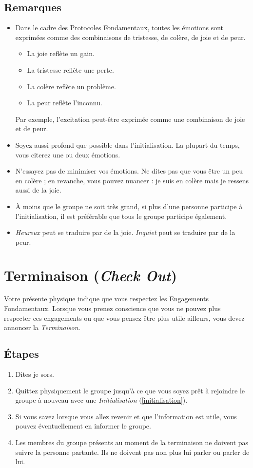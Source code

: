 \documentclass[11pt]{book}
\newcommand*{\numref}[1]{{\hyperref[{#1}]{\autoref*{#1}}}}
\let\oldsection\section
\renewcommand\section{\clearpage\oldsection}
\begin{document}
\subsection{Remarques}
\begin{itemize}
	\item Dans le cadre des Protocoles Fondamentaux, toutes les émotions sont exprimées comme des combinaisons de tristesse, de colère,
	      de joie et de peur.
	      \begin{itemize}
	      	\item La joie reflète un gain.
	      	\item La tristesse reflète une perte.
	      	\item La colère reflète un problème.
	      	\item La peur reflète l'inconnu.
	      \end{itemize}
	      Par exemple, l'excitation peut-être exprimée comme une combinaison de joie et de peur.
	\item Soyez aussi profond que possible dans l'initialisation. La plupart du temps, vous citerez une ou deux émotions.
	\item N'essayez pas de minimiser vos émotions. Ne dites pas que vous être \og{}un peu\fg{} en colère ; en revanche, vous pouvez nuancer :
	      \og{}je suis en colère mais je ressens aussi de la joie\fg{}.
	\item À moins que le groupe ne soit très grand, si plus d'une personne participe à l'initialisation, il est préférable que tous le groupe
	      participe également.
	\item \emph{Heureux} peut se traduire par de la joie. \emph{Inquiet} peut se traduire par de la peur.
\end{itemize}

\section{Terminaison (\emph{Check Out})} \label{terminaison}

Votre présente physique indique que vous respectez les Engagements Fondamentaux. Lorsque vous prenez conscience que vous ne pouvez plus
respecter ces engagements ou que vous pensez être plus utile ailleurs, vous devez annoncer la \emph{Terminaison}.

\subsection{Étapes}
\begin{enumerate}
	\item Dites \og{}je sors\fg{}.
	\item Quittez physiquement le groupe jusqu'à ce que vous soyez prêt à rejoindre le groupe à nouveau avec une \emph{Initialisation} (\numref{initialisation}).
	\item Si vous savez lorsque vous allez revenir et que l'information est utile, vous pouvez éventuellement en informer le groupe.
	\item Les membres du groupe présents au moment de la terminaison ne doivent pas suivre la personne partante. Ils ne doivent pas non plus lui parler ou
	      parler de lui.
\end{enumerate}
\end{document}
